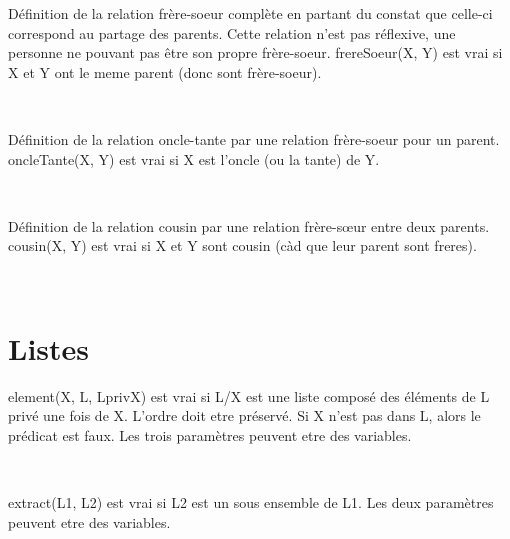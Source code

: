\documentclass[a4paper, 11pt]{article}
\newenvironment{DDbox}[1]{
\begin{lrbox}{\BBbox}\begin{minipage}{\linewidth}}
{\end{minipage}\end{lrbox}\noindent\colorbox{Zgris}{\usebox{\BBbox}} \\
[.5cm]}
\begin{document}
Définition de la relation frère-soeur complète en partant du
constat que celle-ci correspond au partage des parents. Cette
relation n'est pas réflexive, une personne ne pouvant pas être
son propre frère-soeur. frereSoeur(X, Y) est vrai si X et Y ont
le meme parent (donc sont frère-soeur). \\
\begin{DDbox}{\linewidth}
    
\end{DDbox}

Définition de la relation oncle-tante par une relation
frère-soeur pour un parent. oncleTante(X, Y) est vrai si X est
l'oncle (ou la tante) de Y. \\
\begin{DDbox}{\linewidth}
    
\end{DDbox}

Définition de la relation cousin par une relation frère-sœur
entre deux parents.  cousin(X, Y) est vrai si X et Y sont cousin
(càd que leur parent sont freres). \\
\begin{DDbox}{\linewidth}
    
\end{DDbox}

%     

\newpage
\section{Listes}
element(X, L, LprivX) est vrai si L/X est une liste composé des
éléments de L privé une fois de X. L'ordre doit etre préservé.  Si
X n'est pas dans L, alors le prédicat est faux.  Les trois
paramètres peuvent etre des variables. \\
\begin{DDbox}{\linewidth}
    
\end{DDbox}

extract(L1, L2) est vrai si L2 est un sous ensemble de L1. Les
deux paramètres peuvent etre des variables. \\
\begin{DDbox}{\linewidth}
    
\end{DDbox}
\end{document}

